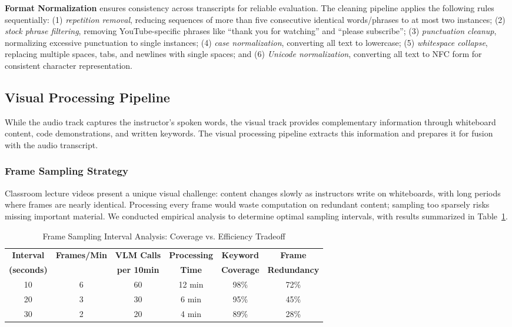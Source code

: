 \textbf{Format Normalization} ensures consistency across transcripts for reliable evaluation. The cleaning pipeline applies the following rules sequentially: (1) \textit{repetition removal}, reducing sequences of more than five consecutive identical words/phrases to at most two instances; (2) \textit{stock phrase filtering}, removing YouTube-specific phrases like ``thank you for watching'' and ``please subscribe''; (3) \textit{punctuation cleanup}, normalizing excessive punctuation to single instances; (4) \textit{case normalization}, converting all text to lowercase; (5) \textit{whitespace collapse}, replacing multiple spaces, tabs, and newlines with single spaces; and (6) \textit{Unicode normalization}, converting all text to NFC form for consistent character representation.

\subsection{Visual Processing Pipeline}

While the audio track captures the instructor's spoken words, the visual track provides complementary information through whiteboard content, code demonstrations, and written keywords. The visual processing pipeline extracts this information and prepares it for fusion with the audio transcript.

\subsubsection{Frame Sampling Strategy}

Classroom lecture videos present a unique visual challenge: content changes slowly as instructors write on whiteboards, with long periods where frames are nearly identical. Processing every frame would waste computation on redundant content; sampling too sparsely risks missing important material. We conducted empirical analysis to determine optimal sampling intervals, with results summarized in Table~\ref{tab:sampling}.

\begin{table}[h]
\centering
\caption{Frame Sampling Interval Analysis: Coverage vs. Efficiency Tradeoff}
\label{tab:sampling}
\begin{tabular}{|c|c|c|c|c|c|}
\hline
\textbf{Interval} & \textbf{Frames/Min} & \textbf{VLM Calls} & \textbf{Processing} & \textbf{Keyword} & \textbf{Frame} \\
\textbf{(seconds)} & & \textbf{per 10min} & \textbf{Time} & \textbf{Coverage} & \textbf{Redundancy} \\
\hline
10 & 6 & 60 & 12 min & 98\% & 72\% \\
\hline
20 & 3 & 30 & 6 min & 95\% & 45\% \\
\hline
30 & 2 & 20 & 4 min & 89\% & 28\% \\
\hline
\end{tabular}
\end{table}

